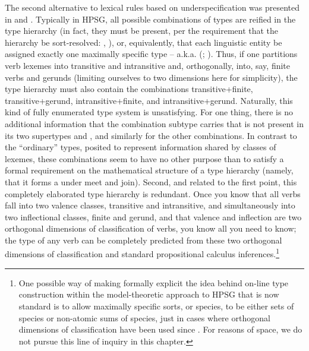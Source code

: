 \documentclass[output=paper
 	        ,biblatex
                ,babelshorthands
                ,newtxmath
                ,draftmode
                ,colorlinks, citecolor=brown
]{langscibook}
\begin{document}
The second alternative to lexical rules based on underspecification was presented in  and . Typically in HPSG, all possible combinations of types are reified in the type hierarchy (in fact, they must be present, per the requirement that the hierarchy be sort-resolved: \citealt{Carpenter1992}, \citealt{PollardandSag1994}), or, equivalently, that each linguistic entity be assigned exactly one maximally specific type -- a.k.a.  (\citealt[78]{Richter2000}; ).
Thus, if one partitions verb lexemes into transitive and intransitive and, orthogonally, into, say, finite verbs and gerunds (limiting ourselves to two dimensions here for simplicity), the type hierarchy must also contain the combinations transitive+finite, transitive+gerund, intransitive+finite, and intransitive+gerund. Naturally, this kind of fully enumerated type system is unsatisfying. For one thing, there is no additional information that the combination subtype  carries that is not present in its two supertypes  and , and similarly for the other combinations. In contrast to the ``ordinary'' types, posited to represent information shared by classes of lexemes, these combinations seem to have no other purpose than to satisfy a formal requirement on the mathematical structure of a type hierarchy (namely, that it forms a  under meet and join).  Second, and related to the first point, this completely elaborated type hierarchy is redundant. Once you know that all verbs fall into two valence classes, transitive and intransitive, and simultaneously into two inflectional classes, finite and gerund, and that valence and inflection are two orthogonal dimensions of classification of verbs, you know all you need to know; the type of any verb can be completely predicted from these two orthogonal dimensions of classification and standard propositional calculus inferences.\footnote{One possible way of making formally explicit the idea behind on-line type construction within the model-theoretic approach to HPSG that is now standard \citep{King1989,Richter2000,chapters/formal-background} is to allow maximally specific sorts, or species, to be either sets of species or non-atomic sums of species,  just in cases where orthogonal dimensions of classification have been used since \citet{Flickinger1987}. For reasons of space, we do not pursue this line of inquiry in this chapter.}
\end{document}

